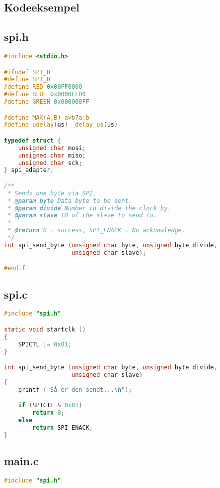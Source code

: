 \documentclass[article, 10pt]{memoir}
\begin{document}
\clearpage
\begin{landscape}
\begin{multicols}{2}
\chapter{Kodeeksempel}
\section{spi.h}

\begin{lstlisting}[language=c]
#include <stdio.h>

#ifndef SPI_H
#define SPI_H
#define RED 0x00FF0000
#define BLUE 0x0000FF00
#define GREEN 0x000000FF

#define MAX(A,B) a>b?a:b
#define udelay(us) _delay_us(us)

typedef struct {
    unsigned char mosi;
    unsigned char miso;
    unsigned char sck;
} spi_adapter;

/**
 * Sends one byte via SPI.
 * @param byte Data byte to be sent.
 * @param divide Number to divide the clock by.
 * @param slave ID of the slave to send to.
 *
 * @return 0 = success, SPI_ENACK = No acknowledge.
 */
int spi_send_byte (unsigned char byte, unsigned byte divide,
                   unsigned char slave);

#endif
\end{lstlisting}

\vfill
\columnbreak
\section{spi.c}
\begin{lstlisting}[language=c]
#include "spi.h"

static void startclk ()
{
    SPICTL |= 0x01;
}

int spi_send_byte (unsigned char byte, unsigned byte divide,
                   unsigned char slave)
{
    printf ("Så er den sendt...\n");

    if (SPICTL & 0x01)
        return 0;
    else
        return SPI_ENACK;
}

\end{lstlisting}

\vfill
\columnbreak

\section{main.c}
\begin{lstlisting}[language=c]
#include "spi.h"


\end{lstlisting}
\end{multicols}
\end{landscape}
\end{document}
